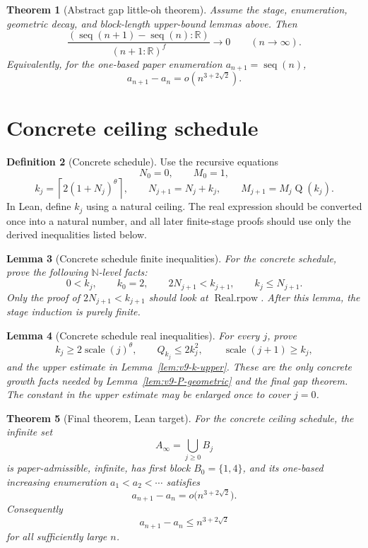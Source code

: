 \documentclass[11pt]{article}
\theoremstyle{definition}
\newtheorem{definition}{Definition}[section]
\theoremstyle{plain}
\newtheorem{theorem}[definition]{Theorem}
\newtheorem{lemma}[definition]{Lemma}
\theoremstyle{remark}
\newcommand{\N}{\mathbb{N}}
\newcommand{\R}{\mathbb{R}}
\newcommand{\Qfun}{\operatorname{Q}}
\newcommand{\seq}{\operatorname{seq}}
\newcommand{\thetaC}{\theta}
\newcommand{\fexp}{f}
\newcommand{\Scale}{\operatorname{scale}}
\begin{document}
\begin{theorem}[Abstract gap little-oh theorem]\label{thm:v9-abstract-gap-little-o}
Assume the stage, enumeration, geometric decay, and block-length upper-bound lemmas above.  Then
\[
        \frac{(\seq(n+1)-\seq(n):\R)}{(n+1:\R)^{\fexp}}\to0
        \qquad(n\to\infty).
\]
Equivalently, for the one-based paper enumeration \(a_{n+1}=\seq(n)\),
\[
        a_{n+1}-a_n=o(n^{3+2\sqrt2}).
\]
\end{theorem}

\section{Concrete ceiling schedule}\label{sec:v9-concrete-ceiling}

\begin{definition}[Concrete schedule]\label{def:v9-concrete-schedule}
Use the recursive equations
\[
        N_0=0,
        \qquad M_0=1,
\]
\[
        k_j=\left\lceil 2(1+N_j)^{\thetaC}\right\rceil,
        \qquad
        N_{j+1}=N_j+k_j,
        \qquad
        M_{j+1}=M_j\Qfun(k_j).
\]
In Lean, define \(k_j\) using a natural ceiling.  The real expression should be converted once into a natural number, and all later finite-stage proofs should use only the derived inequalities listed below.
\end{definition}

\begin{lemma}[Concrete schedule finite inequalities]\label{lem:v9-concrete-finite-ineq}
For the concrete schedule, prove the following \(\N\)-level facts:
\[
        0<k_j,
        \qquad
        k_0=2,
        \qquad
        2N_{j+1}<k_{j+1},
        \qquad
        k_j\le N_{j+1}.
\]
Only the proof of \(2N_{j+1}<k_{j+1}\) should look at \(\operatorname{Real.rpow}\).  After this lemma, the stage induction is purely finite.
\end{lemma}

\begin{lemma}[Concrete schedule real inequalities]\label{lem:v9-concrete-real-ineq}
For every \(j\), prove
\[
        k_j\ge 2\Scale(j)^{\thetaC},
        \qquad
        Q_{k_j}\le 2k_j^2,
        \qquad
        \Scale(j+1)\ge k_j,
\]
and the upper estimate in Lemma~\ref{lem:v9-k-upper}.  These are the only concrete growth facts needed by Lemma~\ref{lem:v9-P-geometric} and the final gap theorem.  The constant in the upper estimate may be enlarged once to cover \(j=0\).
\end{lemma}

\begin{theorem}[Final theorem, Lean target]\label{thm:v9-final}
For the concrete ceiling schedule, the infinite set
\[
        A_\infty=\bigcup_{j\ge0}B_j
\]
is paper-admissible, infinite, has first block \(B_0=\{1,4\}\), and its one-based increasing enumeration \(a_1<a_2<\cdots\) satisfies
\[
        a_{n+1}-a_n=o\bigl(n^{3+2\sqrt2}\bigr).
\]
Consequently
\[
        a_{n+1}-a_n\le n^{3+2\sqrt2}
\]
for all sufficiently large \(n\).
\end{theorem}
\end{document}

